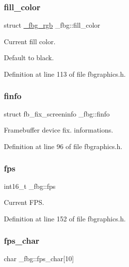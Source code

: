 \subsubsection{\texorpdfstring{fill\+\_\+color}{fill\_color}}
{\footnotesize\ttfamily struct \mbox{\hyperlink{fbgraphics_8h_struct__fbg__rgb}{\+\_\+fbg\+\_\+rgb}} \+\_\+fbg\+::fill\+\_\+color}



Current fill color. 

Default to black. 

Definition at line 113 of file fbgraphics.\+h.

\mbox{\label{struct__fbg_a954dd14a4129eed7ebe09f31bd025861}} 
\subsubsection{\texorpdfstring{finfo}{finfo}}
{\footnotesize\ttfamily struct fb\+\_\+fix\+\_\+screeninfo \+\_\+fbg\+::finfo}



Framebuffer device fix. informations. 



Definition at line 96 of file fbgraphics.\+h.

\mbox{\label{struct__fbg_a64b16363bc48d1e19141df2e242930a9}} 
\subsubsection{\texorpdfstring{fps}{fps}}
{\footnotesize\ttfamily int16\+\_\+t \+\_\+fbg\+::fps}



Current F\+PS. 



Definition at line 152 of file fbgraphics.\+h.

\mbox{\label{struct__fbg_af447e6ed58d893989c8dad075807a79b}} 
\subsubsection{\texorpdfstring{fps\+\_\+char}{fps\_char}}
{\footnotesize\ttfamily char \+\_\+fbg\+::fps\+\_\+char\mbox{[}10\mbox{]}}



